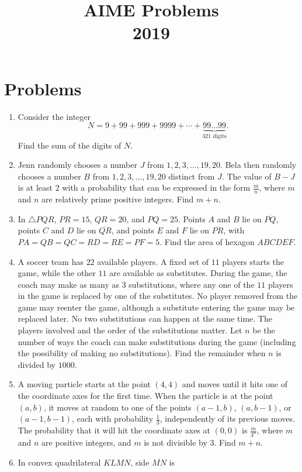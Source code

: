 \documentclass{article}
\title{AIME Problems \\ 2019}
\date{}
\begin{document}
\maketitle\thispagestyle{fancy}\newpage\section*{Problems}\begin{enumerate}[label=\arabic*., itemsep=0.5em]\item Consider the integer 
\begin{equation*}
N = 9 + 99 + 999 + 9999 + \cdots + \underbrace{99\ldots 99}_\text{321 digits}.
\end{equation*}
Find the sum of the digits of $N$.\par \vspace{0.5em}\item Jenn randomly chooses a number $J$ from $1, 2, 3,\ldots, 19, 20$. Bela then randomly chooses a number $B$ from $1, 2, 3,\ldots, 19, 20$ distinct from $J$. The value of $B - J$ is at least $2$ with a probability that can be expressed in the form $\tfrac{m}{n}$, where $m$ and $n$ are relatively prime positive integers. Find $m+n$.\par \vspace{0.5em}\item In $\triangle PQR$, $PR=15$, $QR=20$, and $PQ=25$. Points $A$ and $B$ lie on $\overline{PQ}$, points $C$ and $D$ lie on $\overline{QR}$, and points $E$ and $F$ lie on $\overline{PR}$, with $PA=QB=QC=RD=RE=PF=5$. Find the area of hexagon $ABCDEF$.\par \vspace{0.5em}\item A soccer team has $22$ available players. A fixed set of $11$ players starts the game, while the other $11$ are available as substitutes. During the game, the coach may make as many as $3$ substitutions, where any one of the $11$ players in the game is replaced by one of the substitutes. No player removed from the game may reenter the game, although a substitute entering the game may be replaced later. No two substitutions can happen at the same time. The players involved and the order of the substitutions matter. Let $n$ be the number of ways the coach can make substitutions during the game (including the possibility of making no substitutions). Find the remainder when $n$ is divided by $1000$.\par \vspace{0.5em}\item A moving particle starts at the point $(4,4)$ and moves until it hits one of the coordinate axes for the first time. When the particle is at the point $(a,b)$, it moves at random to one of the points $(a-1,b)$, $(a,b-1)$, or $(a-1,b-1)$, each with probability $\tfrac{1}{3}$, independently of its previous moves. The probability that it will hit the coordinate axes at $(0,0)$ is $\tfrac{m}{3^n}$, where $m$ and $n$ are positive integers, and $m$ is not divisible by $3$. Find $m + n$.\par \vspace{0.5em}\item In convex quadrilateral $KLMN$, side $\overline{MN}$ is 
\end{enumerate}
\end{document}

